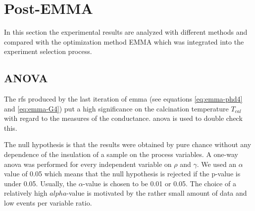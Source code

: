 \section{Post-EMMA}
\label{sec:res-post-emma}
In this section the experimental results are analyzed with different methods and compared 
with the optimization method EMMA which was integrated into the experiment selection process. 
\subsection{ANOVA}\label{sec:res-anova}
The \gls{rf}s produced by the last iteration of \gls{emma} (see equations \ref{eq:emma-phd4} and \ref{eq:emma-G4}) put a high significance
on the calcination temperature $T_{cal}$ with regard to the 
measures of the conductance. 
\Gls{anova} is used to double check this. 

The null hypothesis is that the results were obtained by pure chance without any dependence of the insulation of a sample on the process variables.
A one-way \gls{anova} was performed for every independent variable on $\rho$ and $\gamma$. 
We used an $\alpha$ value of 0.05 which means that 
the null hypothesis is rejected if the p-value is under 0.05. 
Usually, the $\alpha$-value is chosen to be 0.01 or 0.05\cite{hoffman2020concept,sellke2001pvalues}.
The choice of a relatively high $alpha$-value is motivated by the rather small amount of data and low events per variable ratio.
%

